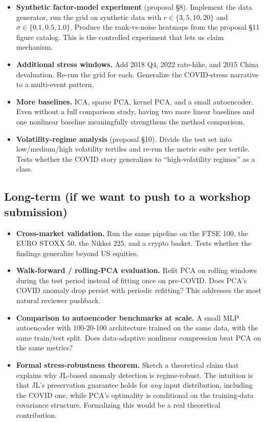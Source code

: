 \documentclass[11pt]{article}
\begin{document}
\begin{itemize}
    \item \textbf{Synthetic factor-model experiment} (proposal §8). Implement the data generator, run the grid on synthetic data with $r \in \{3, 5, 10, 20\}$ and $\sigma \in \{0.1, 0.5, 1.0\}$. Produce the rank-vs-noise heatmaps from the proposal §11 figure catalog. This is the controlled experiment that lets us claim mechanism.
    \item \textbf{Additional stress windows.} Add 2018 Q4, 2022 rate-hike, and 2015 China devaluation. Re-run the grid for each. Generalize the COVID-stress narrative to a multi-event pattern.
    \item \textbf{More baselines.} ICA, sparse PCA, kernel PCA, and a small autoencoder. Even without a full comparison study, having two more linear baselines and one nonlinear baseline meaningfully strengthens the method comparison.
    \item \textbf{Volatility-regime analysis} (proposal §10). Divide the test set into low/medium/high volatility tertiles and re-run the metric suite per tertile. Tests whether the COVID story generalizes to ``high-volatility regimes'' as a class.
\end{itemize}

\subsection{Long-term (if we want to push to a workshop submission)}

\begin{itemize}
    \item \textbf{Cross-market validation.} Run the same pipeline on the FTSE 100, the EURO STOXX 50, the Nikkei 225, and a crypto basket. Tests whether the findings generalize beyond US equities.
    \item \textbf{Walk-forward / rolling-PCA evaluation.} Refit PCA on rolling windows during the test period instead of fitting once on pre-COVID. Does PCA's COVID anomaly drop persist with periodic refitting? This addresses the most natural reviewer pushback.
    \item \textbf{Comparison to autoencoder benchmarks at scale.} A small MLP autoencoder with 100-20-100 architecture trained on the same data, with the same train/test split. Does data-adaptive nonlinear compression beat PCA on the same metrics?
    \item \textbf{Formal stress-robustness theorem.} Sketch a theoretical claim that explains why JL-based anomaly detection is regime-robust. The intuition is that JL's preservation guarantee holds for \emph{any} input distribution, including the COVID one, while PCA's optimality is conditional on the training-data covariance structure. Formalizing this would be a real theoretical contribution.
\end{itemize}
\end{document}
